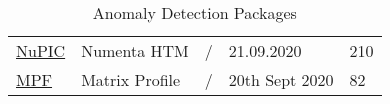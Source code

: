 \begin{table}[h]
{\begin{tabular}{lllll}
            \href{https://github.com/numenta/nupic}{NuPIC}                                                          & Numenta HTM                                                                                                                                                                                                                                                                                                                                                                                                                   & /         & 21.09.2020        & 210   \\\addlinespace
            \href{https://github.com/matrix-profile-foundation/matrixprofile}{MPF}                                  & Matrix Profile                                                                                                                                                                                                                                                                                                                                                                                                                & /         & 20th Sept 2020    & 82    \\
        \end{tabular}
    }
    \caption{Anomaly Detection Packages}\label{tab:ad-packages}
\end{table}


